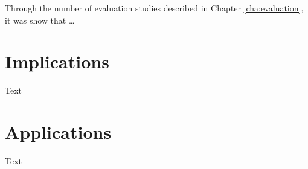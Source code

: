 
Through the number of evaluation studies described in Chapter
\ref{cha:evaluation}, it was show that \ldots

\section{Implications}

Text

\section{Applications}

Text
